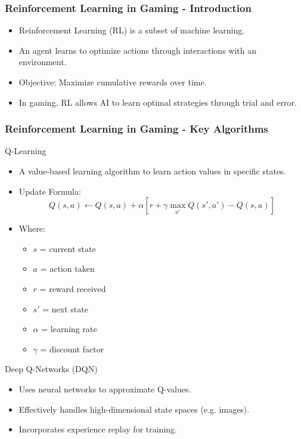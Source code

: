 \documentclass[aspectratio=169]{beamer}
\begin{document}
\begin{frame}[fragile]
    \frametitle{Reinforcement Learning in Gaming - Introduction}
    \begin{itemize}
        \item Reinforcement Learning (RL) is a subset of machine learning.
        \item An agent learns to optimize actions through interactions with an environment.
        \item Objective: Maximize cumulative rewards over time.
        \item In gaming, RL allows AI to learn optimal strategies through trial and error.
    \end{itemize}
\end{frame}

\begin{frame}[fragile]
    \frametitle{Reinforcement Learning in Gaming - Key Algorithms}
    \begin{block}{Q-Learning}
        \begin{itemize}
            \item A value-based learning algorithm to learn action values in specific states.
            \item Update Formula:
            \begin{equation}
            Q(s, a) \leftarrow Q(s, a) + \alpha \left[ r + \gamma \max_{a'} Q(s', a') - Q(s, a) \right]
            \end{equation}
            \item Where:
            \begin{itemize}
                \item \( s \) = current state
                \item \( a \) = action taken
                \item \( r \) = reward received
                \item \( s' \) = next state
                \item \( \alpha \) = learning rate
                \item \( \gamma \) = discount factor
            \end{itemize}
        \end{itemize}
    \end{block}
    \begin{block}{Deep Q-Networks (DQN)}
        \begin{itemize}
            \item Uses neural networks to approximate Q-values.
            \item Effectively handles high-dimensional state spaces (e.g. images).
            \item Incorporates experience replay for training.
        \end{itemize}
    \end{block}
\end{frame}
\end{document}
